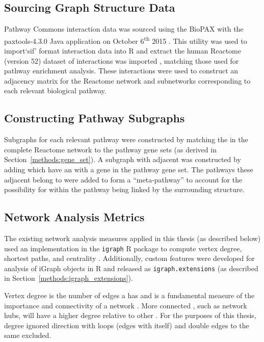 \subsection{Sourcing Graph Structure Data} \label{methods:graph_data}
Pathway Commons interaction data was sourced using the \gls{BioPAX} with the paxtools-4.3.0 Java application on October 6\textsuperscript{th} 2015 \citep{PathwayCommons, paxtools}. This utility was used to import`sif' format interaction data into R \citep{R_core} and extract the human Reactome (version 52) dataset of interactions was imported \citep{Reactome}, matching those used for \gls{pathway} enrichment analysis. These interactions were used to construct an adjacency matrix for the Reactome network and subnetworks corresponding to each relevant biological \gls{pathway}. 

\subsection{Constructing Pathway Subgraphs} \label{methods:subgraphs}
Subgraphs for each relevant \gls{pathway} were constructed by matching the  in the complete Reactome network to the \gls{pathway} gene sets (as derived in Section~\ref{methods:gene_set}). A subgraph with adjacent  was constructed by adding  which have an  with a gene in the \gls{pathway} gene set. The \glspl{pathway} these adjacent  belong to were added to form a ``meta-\gls{pathway}'' to account for the possibility for  within the \gls{pathway} being linked by the surrounding  structure.

\subsection{Network Analysis Metrics} \label{methods:network_metrics}
The existing network analysis measures applied in this thesis (as described below) used an implementation in the \texttt{igraph} R package to compute vertex degree, shortest paths, and centrality \citep{igraph}. Additionally, custom features were developed for analysis of iGraph objects in R and released as \texttt{igraph.extensions} (as described in Section~\ref{methods:igraph_extensions}).

Vertex degree is the number of \glspl{edge} a  has and is a fundamental measure of the importance and connectivity of a network \citep{vanSteen2010}. More connected , such as network hubs, will have a higher  degree relative to other . For the purposes of this thesis,  degree ignored  direction with loops (edges with itself) and double \glspl{edge} to the same  excluded.

